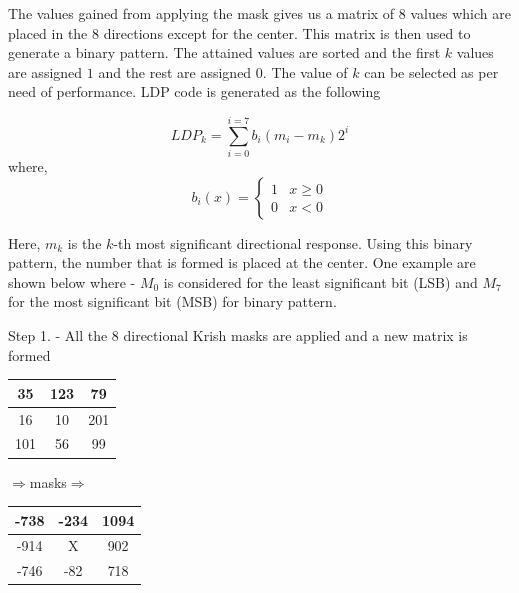 \documentclass[conference]{IEEEtran}
\begin{document}
The values gained from applying the mask gives us a matrix of 8 values which are placed in the 8 directions except for the center. This matrix is then used to generate a binary pattern. The attained values are sorted and the first $k$ values are assigned $1$ and the rest are assigned $0$. The value of $k$ can be selected as per need of performance. LDP code is generated as the following

\begin{equation}
LDP_{k}=\sum_{i=0}^{i=7} b_i(m_i - m_k)2^i
\end{equation}
where,
\begin{equation}
b_i(x)=
\begin{cases}
1 & x \ge 0\\
0 & x < 0
\end{cases}
\end{equation}

Here, $m_k$ is the $k$-th most significant directional response. Using this binary pattern, the number that is formed is placed at the center. One example are shown below where - $M_0$ is considered for the least significant bit (LSB) and $M_7$ for the most significant bit (MSB) for binary pattern.

\begin{center}
	Step 1. - All the 8 directional Krish masks are applied and a new matrix is formed\\
\end{center}
\begin{center}
	\begin{tabular}{|c|c|c|}
		\hline
		35 & 123 & 79 \\
		\hline
		16 & 10 & 201 \\
		\hline
		101 & 56 & 99 \\
		\hline
	\end{tabular}
	$\Longrightarrow$masks$\Longrightarrow$
	\begin{tabular}{|c|c|c|}
		\hline
		-738 & -234 & 1094 \\
		\hline
		-914 & X & 902 \\
		\hline
		-746 & -82 & 718 \\
		\hline
	\end{tabular}
\end{center}
\end{document}
